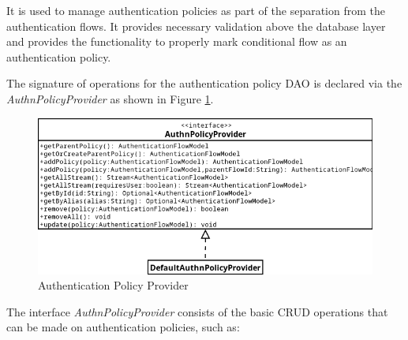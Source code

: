 It is used to manage authentication policies as part of the separation from the authentication flows.
It provides necessary validation above the database layer and provides the functionality to properly mark conditional flow as an authentication policy.

The signature of operations for the authentication policy DAO is declared via the \textit{AuthnPolicyProvider} as shown in Figure \ref{fig:impl-authn-policies-provider-diagram}.

\begin{figure}[htbp]
  \centering
  \includegraphics[width=1\textwidth]{img/sections/6-implementation/authn-policy-provider-diagram.png}
  \caption{Authentication Policy Provider}
  \label{fig:impl-authn-policies-provider-diagram}
\end{figure}

\newpage

The interface \textit{AuthnPolicyProvider} consists of the basic CRUD operations that can be made on authentication policies, such as:

